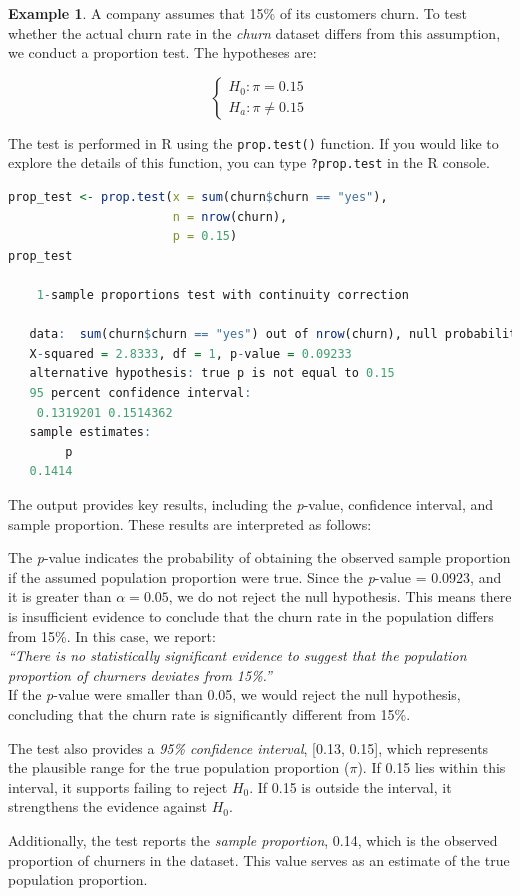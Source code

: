 \documentclass[
]{book}
\newcommand{\passthrough}[1]{#1}
\theoremstyle{definition}
\theoremstyle{definition}
\newtheorem{example}{Example}[chapter]
\theoremstyle{definition}
\theoremstyle{definition}
\theoremstyle{remark}
\begin{document}
\begin{example}
\protect\hypertarget{exm:ex-test-proportion}{}\label{exm:ex-test-proportion}A company assumes that 15\% of its customers churn. To test whether the actual churn rate in the \emph{churn} dataset differs from this assumption, we conduct a proportion test. The hypotheses are:

\[
\begin{cases}
H_0: \pi  =   0.15 \\ 
H_a: \pi \neq 0.15 
\end{cases}
\]

The test is performed in R using the \passthrough{\lstinline!prop.test()!} function. If you would like to explore the details of this function, you can type \passthrough{\lstinline!?prop.test!} in the R console.

\begin{lstlisting}[language=R]
prop_test <- prop.test(x = sum(churn$churn == "yes"), 
                       n = nrow(churn), 
                       p = 0.15)
prop_test
   
    1-sample proportions test with continuity correction
   
   data:  sum(churn$churn == "yes") out of nrow(churn), null probability 0.15
   X-squared = 2.8333, df = 1, p-value = 0.09233
   alternative hypothesis: true p is not equal to 0.15
   95 percent confidence interval:
    0.1319201 0.1514362
   sample estimates:
        p 
   0.1414
\end{lstlisting}

The output provides key results, including the \emph{p}-value, confidence interval, and sample proportion. These results are interpreted as follows:

The \emph{p}-value indicates the probability of obtaining the observed sample proportion if the assumed population proportion were true. Since the \emph{p}-value = 0.0923, and it is greater than \(\alpha = 0.05\), we do not reject the null hypothesis. This means there is insufficient evidence to conclude that the churn rate in the population differs from 15\%. In this case, we report:\\
\emph{``There is no statistically significant evidence to suggest that the population proportion of churners deviates from 15\%.''}\\
If the \emph{p}-value were smaller than 0.05, we would reject the null hypothesis, concluding that the churn rate is significantly different from 15\%.

The test also provides a \emph{95\% confidence interval}, {[}0.13, 0.15{]}, which represents the plausible range for the true population proportion (\(\pi\)). If 0.15 lies within this interval, it supports failing to reject \(H_0\). If 0.15 is outside the interval, it strengthens the evidence against \(H_0\).

Additionally, the test reports the \emph{sample proportion}, 0.14, which is the observed proportion of churners in the dataset. This value serves as an estimate of the true population proportion.
\end{example}
\end{document}
